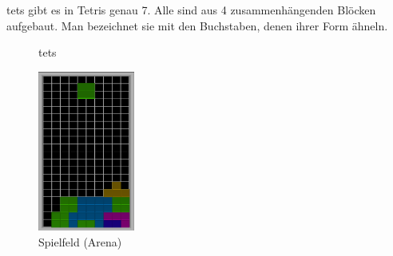 \documentclass[11pt]{article}
\begin{document}
\glspl{tet} gibt es in Tetris genau 7. Alle sind aus 4 zusammenhängenden Blöcken aufgebaut. 
Man bezeichnet sie mit den Buchstaben, denen ihrer Form ähneln.\cite{Tetromino}
\begin{figure}[h]
  \centering
  \caption{\glspl{tet}}
  \label{tet-abb}
\end{figure}

\begin{figure}
  \includegraphics[width=120px]{../images/arena.png}
  \vspace{-20pt}
  \caption{Spielfeld (Arena)}
  \label{arena}
\end{figure}
\end{document}
